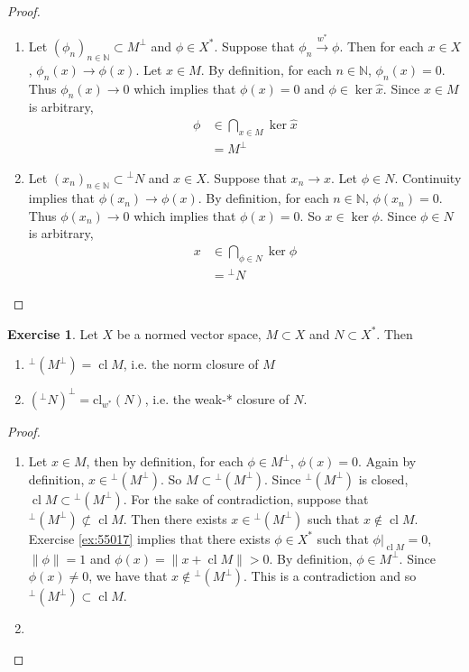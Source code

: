 \documentclass[12pt]{amsart}
\theoremstyle{definition}
\newtheorem{ex}[definition]{Exercise}
\newcommand{\N}{\mathbb{N}}
\newcommand{\conv}[1]{\xrightarrow{#1}}
\DeclareMathOperator{\cl}{cl}
\newcommand{\rex}[1]{Exercise \ref{ex:#1}}
\begin{document}
	\begin{proof}\
	\begin{enumerate}
	\item Let $(\phi_n)_{n \in \N} \subset M^{\perp}$ and $\phi \in X^*$. Suppose that $\phi_n \conv{w^*} \phi$. Then for each $x \in X$, $\phi_n(x) \rightarrow \phi(x)$. Let $x \in M$. By definition, for each $n \in \N$, $\phi_n(x) = 0$. Thus $\phi_n(x) \rightarrow 0$ which implies that $\phi(x) = 0$ and $\phi \in \ker \hat{x}$. Since $x \in M$ is arbitrary, 
	\begin{align*}
	\phi 
	&\in \bigcap_{x \in M} \ker \hat{x} \\
	&= M^{\perp}
	\end{align*}
	\item Let $(x_n)_{n \in \N} \subset {^{\perp} N}$ and $x \in X$. Suppose that $x_n \rightarrow x$. Let $\phi \in N$. Continuity implies that $\phi(x_n) \rightarrow \phi(x)$. By definition, for each $n \in \N$, $\phi(x_n) = 0$. Thus $\phi(x_n) \rightarrow 0$ which implies that $\phi(x) = 0$. So $x \in \ker \phi$. Since $\phi \in N$ is arbitrary, 
	\begin{align*}
	x 
	&\in \bigcap_{\phi \in N} \ker \phi \\
	&= {^{\perp}N}
	\end{align*}
	\end{enumerate}
	\end{proof}
	
	\begin{ex}
	Let $X$ be a normed vector space, $M \subset X$ and $N \subset X^*$. Then 
	\begin{enumerate}
	\item $^{\perp}(M^{\perp}) = \cl M$, i.e. the norm closure of $M$
	\item $({^{\perp}N})^{\perp} = \text{cl}_{w^*}(N)$, i.e. the weak-* closure of $N$.
	\end{enumerate}
	\end{ex}
	
	\begin{proof}\
	\begin{enumerate}
	\item Let $x \in M$, then by definition, for each $\phi \in M^{\perp}$, $\phi(x) = 0$. Again by definition, $x \in {^{\perp}(M^{\perp})}$. So $M \subset {^{\perp}(M^{\perp})}$. Since ${^{\perp}(M^{\perp})}$ is closed, $\cl M \subset {^{\perp}(M^{\perp})}$. For the sake of contradiction, suppose that ${^{\perp}(M^{\perp})} \not \subset \cl M$. Then there exists $x \in {^{\perp}(M^{\perp})}$ such that $x \not \in \cl M$. \rex{55017} implies that there exists $\phi \in X^*$ such that $\phi|_{\cl M} = 0$, $\|\phi\| = 1$ and $\phi(x) = \|x + \cl M\| > 0$. By definition, $\phi \in M^{\perp}$. Since $\phi(x) \neq 0$, we have that $x \not \in {^{\perp}(M^{\perp})}$. This is a contradiction and so ${^{\perp}(M^{\perp})} \subset \cl M$.
	\item 
	\end{enumerate}
	\end{proof}
	
\end{document}
